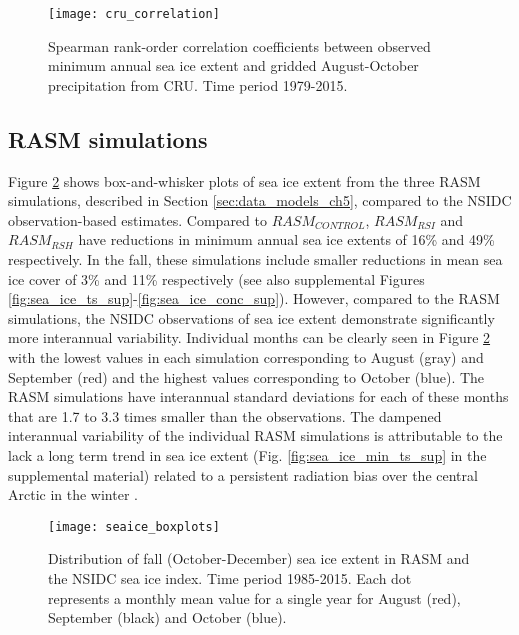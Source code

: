 \begin{figure}
  \centering
  \texttt{[image: cru\_correlation]}
  \caption{Spearman rank-order correlation coefficients between observed minimum annual sea ice extent and gridded August-October precipitation from CRU. Time period 1979-2015.}
  \label{fig:prec_spatial_corr}
\end{figure}

\subsection{RASM simulations}
\label{sec:rasm_results}

Figure \ref{fig:sea_ice_box} shows box-and-whisker plots of sea ice extent from the three RASM simulations, described in Section \ref{sec:data_models_ch5}, compared to the NSIDC observation-based estimates.
Compared to $RASM_{CONTROL}$, $RASM_{RSI}$ and $RASM_{RSH}$ have reductions in minimum annual sea ice extents of 16\% and 49\% respectively.
In the fall, these simulations include smaller reductions in mean sea ice cover of 3\% and 11\% respectively (see also supplemental Figures \ref{fig:sea_ice_ts_sup}-\ref{fig:sea_ice_conc_sup}).
However, compared to the RASM simulations, the NSIDC observations of sea ice extent demonstrate significantly more interannual variability.
Individual months can be clearly seen in Figure \ref{fig:sea_ice_box} with the lowest values in each simulation corresponding to August (gray) and September (red) and the highest values corresponding to October (blue).
The RASM simulations have interannual standard deviations for each of these months that are 1.7 to 3.3 times smaller than the observations.
The dampened interannual variability of the individual RASM simulations is attributable to the lack a long term trend in sea ice extent (Fig. \ref{fig:sea_ice_min_ts_sup} in the supplemental material) related to a persistent radiation bias over the central Arctic in the winter \citep{Cassano_2016}.

\begin{figure}
  \centering
  \texttt{[image: seaice\_boxplots]}
  \caption{Distribution of fall (October-December) sea ice extent in RASM and the NSIDC sea ice index. Time period 1985-2015. Each dot represents a monthly mean value for a single year for August (red), September (black) and October (blue).}
  \label{fig:sea_ice_box}
\end{figure}


